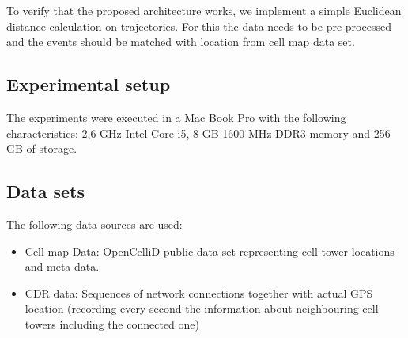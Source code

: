 To verify that the proposed architecture works, we implement a simple Euclidean distance calculation on trajectories. For this the data needs to be pre-processed and the events should be matched with location from cell map data set.

\subsection{Experimental setup}
The experiments were executed in a Mac Book Pro with the following characteristics: 2,6 GHz Intel Core i5, 8 GB 1600 MHz DDR3 memory and 256 GB of storage.

\subsection{Data sets}
The following data sources are used:
\begin{itemize}
\item Cell map Data: OpenCelliD public data set representing cell tower locations and meta data.
\item CDR data: Sequences of network connections together with actual GPS location (recording every second the information about neighbouring cell towers including the connected one)
\end{itemize}

